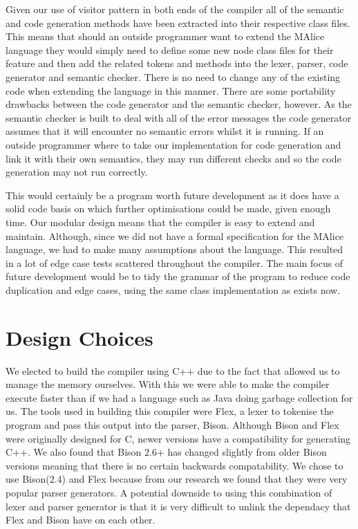\documentclass[8pt, a4paper]{article}
\begin{document}
Given our use of visitor pattern in both ends of the compiler all of the semantic and code generation methods have been extracted into their respective class files. This means that should an outside programmer want to extend the MAlice language they would simply need to define some new node class files for their feature and then add the related tokens and methods into the lexer, parser, code generator and semantic checker. There is no need to change any of the existing code when extending the language in this manner. There are some portability drawbacks between the code generator and the semantic checker, however. As the semantic checker is built to deal with all of the error messages the code generator assumes that it will encounter no semantic errors whilst it is running. If an outside programmer where to take our implementation for code generation and link it with their own semantics, they may run different checks and so the code generation may not run correctly.

This would certainly be a program worth future development as it does have a solid code basis on which further optimisations could be made, given enough time. Our modular design means that the compiler is easy to extend and maintain. Although, since we did not have a formal specification for the MAlice language, we had to make many assumptions about the language. This resulted in a lot of edge case tests scattered throughout the compiler. The main focus of future development would be to tidy the grammar of the program to reduce code duplication and edge cases, using the same class implementation as exists now.

\section{Design Choices}

We elected to build the compiler using C++ due to the fact that allowed us to manage the memory ourselves. With this we were able to make the compiler execute faster than if we had a language such as Java doing garbage collection for us. The tools used in building this compiler were Flex, a lexer to tokenise the program and pass this output into the parser, Bison. Although Bison and Flex were originally designed for C, newer versions have a compatibility for generating C++. We also found that Bison 2.6+ has changed slightly from older Bison versions meaning that there is no certain backwards compatability. We chose to use Bison(2.4) and Flex because from our research we found that they were very popular parser generators. A potential downside to using this combination of lexer and parser generator is that it is very difficult to unlink the dependacy that Flex and Bison have on each other.
\end{document}
